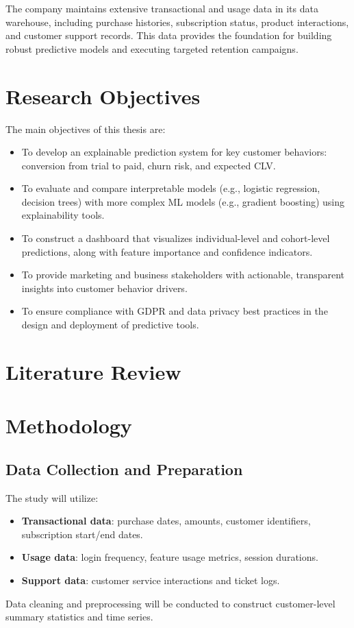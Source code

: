 \documentclass[12pt,a4paper]{article}
\begin{document}
The company maintains extensive transactional and usage data in its data warehouse, including purchase histories, subscription status, product interactions, and customer support records. This data provides the foundation for building robust predictive models and executing targeted retention campaigns.

\section{Research Objectives}
The main objectives of this thesis are:
\begin{itemize}[leftmargin=*]
    \item To develop an explainable prediction system for key customer behaviors: conversion from trial to paid, churn risk, and expected CLV.
    \item To evaluate and compare interpretable models (e.g., logistic regression, decision trees) with more complex ML models (e.g., gradient boosting) using explainability tools.
    \item To construct a dashboard that visualizes individual-level and cohort-level predictions, along with feature importance and confidence indicators.
    \item To provide marketing and business stakeholders with actionable, transparent insights into customer behavior drivers.
    \item To ensure compliance with GDPR and data privacy best practices in the design and deployment of predictive tools.
\end{itemize}

\section{Literature Review}

\section{Methodology}

\subsection{Data Collection and Preparation}
The study will utilize:
\begin{itemize}[leftmargin=*]
    \item \textbf{Transactional data}: purchase dates, amounts, customer identifiers, subscription start/end dates.
    \item \textbf{Usage data}: login frequency, feature usage metrics, session durations.
    \item \textbf{Support data}: customer service interactions and ticket logs.
\end{itemize}
Data cleaning and preprocessing will be conducted to construct customer-level summary statistics and time series.
\end{document}
